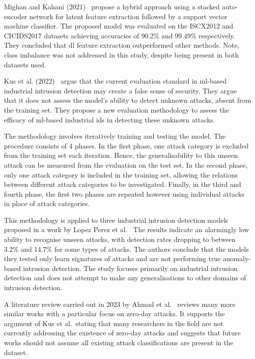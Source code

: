 Mighan and Kahani (2021)~\cite{Mighan} propose a hybrid approach using a
stacked auto-encoder network for latent feature extraction followed by a support
vector machine classifier. The proposed model was evaluated on the ISCX2012 and
CICIDS2017 datasets achieving accuracies of 90.2\% and 99.49\% respectively.
They concluded that \gls{dl} feature extraction outperformed other methods.
Note, class imbalance was not addressed in this study, despite being present in
both datasets used.

Kus et al. (2022)~\cite{Kus} argue that the current evaluation standard in
\gls{ml}-based industrial intrusion detection may create a false sense of
security. They argue that it does not assess the model's ability to detect
unknown attacks, absent from the training set. They propose a new evaluation
methodology to assess the efficacy of \gls{ml}-based industrial \gls{ids} in
detecting these unknown attacks.

The methodology involves iteratively training and testing the model. The
procedure consists of 4 phases. In the first phase, one attack category is
excluded from the training set each iteration. Hence, the generalisability to
this unseen attack can be measured from the evaluation on the test set. In the
second phase, only one attack category is included in the training set,
allowing the relations between different attack categories to be investigated.
Finally, in the third and fourth phase, the first two phases are repeated
however using individual attacks in place of attack categories.

This methodology is applied to three industrial intrusion detection models
proposed in a work by Lopez Perez et al.~\cite{Perez} The results indicate an
alarmingly low ability to recognise unseen attacks, with detection rates
dropping to between 3.2\% and 14.7\% for some types of attacks. The authors
conclude that the models they tested only learn signatures of attacks and are
not performing true anomaly-based intrusion detection. The study focuses
primarily on industrial intrusion detection and does not attempt to make any
generalisations to other domains of intrusion detection.

A literature review carried out in 2023 by Ahmad et al.~\cite{zero-day} reviews
many more similar works with a particular focus on zero-day attacks. It
supports the argument of Kus et al.\ stating that many researchers in the field
are not currently addressing the existence of zero-day attacks and suggests
that future works should not assume all existing attack classifications are
present in the dataset.
